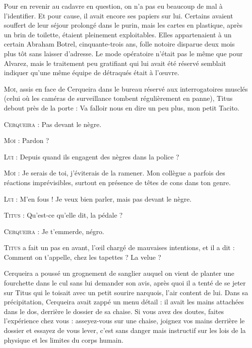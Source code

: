 Pour en revenir au cadavre en question, on n’a pas eu beaucoup de mal à l’identifier. Et pour cause, il avait encore ses papiers sur lui. Certains avaient souffert de leur séjour prolongé dans le purin, mais les cartes en plastique, après un brin de toilette, étaient pleinement exploitables. Elles appartenaient à un certain Abraham Botrel, cinquante-trois ans, folle notoire disparue deux mois plus tôt sans laisser d’adresse. Le mode opératoire n’était pas le même que pour Alvarez, mais le traitement peu gratifiant qui lui avait été réservé semblait indiquer qu’une même équipe de détraqués était à l’œuvre.

\begin{dialogue}

\textsc{Moi}, assis en face de Cerqueira dans le bureau réservé aux interrogatoires musclés (celui où les caméras de surveillance tombent régulièrement en panne), Titus debout près de la porte : Va falloir nous en dire un peu plus, mon petit Tacito.

\textsc{Cerqueira} : Pas devant le nègre.

\textsc{Moi} : Pardon ?

\textsc{Lui} : Depuis quand ils engagent des nègres dans la police ?

\textsc{Moi} : Je serais de toi, j’éviterais de la ramener. Mon collègue a parfois des réactions imprévisibles, surtout en présence de têtes de cons dans ton genre.

\textsc{Lui} : M’en fous ! Je veux bien parler, mais pas devant le nègre.

\textsc{Titus} : Qu’est-ce qu’elle dit, la pédale ?

\textsc{Cerqueira} : Je t’emmerde, négro.

\textsc{Titus} a fait un pas en avant, l’œil chargé de mauvaises intentions, et il a dit : Comment on t’appelle, chez les tapettes ? La velue ?

\end{dialogue}

Cerqueira a poussé un grognement de sanglier auquel on vient de planter une fourchette dans le cul sans lui demander son avis, après quoi il a tenté de se jeter sur Titus qui le toisait avec un petit sourire narquois, l’air content de lui. Dans sa précipitation, Cerqueira avait zappé un menu détail : il avait les mains attachées dans le dos, derrière le dossier de sa chaise. Si vous avez des doutes, faites l’expérience chez vous : asseyez-vous sur une chaise, joignez vos mains derrière le dossier et essayez de vous lever, c’est sans danger mais instructif sur les lois de la physique et les limites du corps humain.


